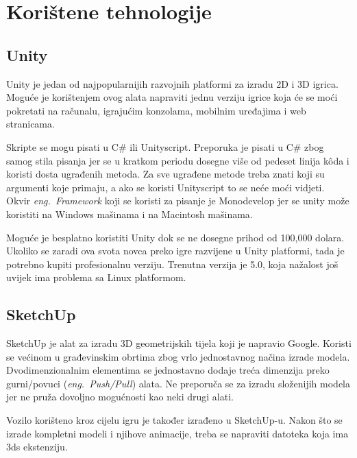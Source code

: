 \section{Korištene tehnologije}
\subsection{Unity}
Unity je jedan od najpopularnijih razvojnih platformi za izradu 2D i 3D igrica. Moguće je korištenjem ovog alata napraviti jednu verziju igrice koja će se moći pokretati na računalu, igrajućim konzolama, mobilnim uređajima i web stranicama. \par
Skripte se mogu pisati u C\# ili Unityscript. Preporuka je pisati u C\# zbog  samog stila pisanja jer se u kratkom periodu dosegne više od pedeset linija k\^oda i koristi dosta ugrađenih metoda. Za sve ugrađene metode treba znati koji su argumenti koje primaju, a ako se koristi Unityscript to se neće moći vidjeti. Okvir \emph{eng.~Framework} koji se koristi za pisanje je Monodevelop jer se unity može koristiti na Windows mašinama i na Macintosh mašinama. 

Moguće je besplatno koristiti Unity dok se ne dosegne prihod od 100,000 dolara. Ukoliko se zaradi ova svota novca preko igre razvijene u Unity platformi, tada je potrebno kupiti profesionalnu verziju. Trenutna verzija je 5.0, koja nažalost još uvijek ima problema sa Linux platformom.

\subsection{SketchUp}
SketchUp je alat za izradu 3D geometrijskih tijela koji je napravio Google. Koristi se većinom u građevinskim obrtima zbog vrlo jednostavnog načina izrade modela. Dvodimenzionalnim elementima se jednostavno dodaje treća dimenzija preko gurni/povuci (\emph{eng.~Push/Pull}) alata. Ne preporuča se za izradu složenijih modela jer ne pruža dovoljno mogućnosti kao neki drugi alati. 

Vozilo korišteno kroz cijelu igru je također izrađeno u SketchUp-u. Nakon što se izrade kompletni modeli i njihove animacije, treba se napraviti datoteka koja ima 3ds ekstenziju.

